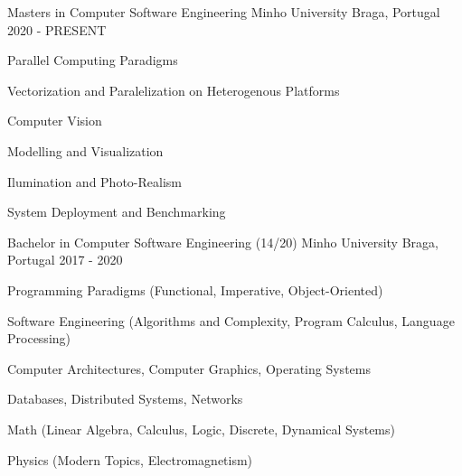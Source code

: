 


\begin{cventries}


\cventry
{Masters in Computer Software Engineering} %
{Minho University} %
{Braga, Portugal} %
{2020 - PRESENT} %
{ %
\begin{cvitems}
\item{Parallel Computing Paradigms}
\item{Vectorization and Paralelization on Heterogenous Platforms}
\item{Computer Vision}
\item{Modelling and Visualization}
\item{Ilumination and Photo-Realism}
\item{System Deployment and Benchmarking}
\end{cvitems}
}


\cventry
  {Bachelor in Computer Software Engineering (14/20)} %
{Minho University} %
{Braga, Portugal} %
{2017 - 2020} %
{ %
\begin{cvitems}
\item{Programming Paradigms (Functional, Imperative, Object-Oriented)}
\item{Software Engineering (Algorithms and Complexity, Program Calculus,
  Language Processing)}
\item{Computer Architectures, Computer Graphics, Operating Systems}
\item{Databases, Distributed Systems, Networks}
\item{Math (Linear Algebra, Calculus, Logic, Discrete, Dynamical Systems)}
\item{Physics (Modern Topics, Electromagnetism)}
\end{cvitems}
}



\end{cventries}
